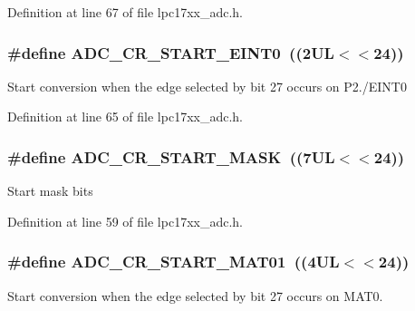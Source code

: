 \-Definition at line 67 of file lpc17xx\-\_\-adc.\-h.

\hypertarget{group___a_d_c___private___macros_gac821b0162480d224ff928bf834bcb431}{
\subsubsection[{\-A\-D\-C\-\_\-\-C\-R\-\_\-\-S\-T\-A\-R\-T\-\_\-\-E\-I\-N\-T0}]{\setlength{\rightskip}{0pt plus 5cm}\#define {\bf \-A\-D\-C\-\_\-\-C\-R\-\_\-\-S\-T\-A\-R\-T\-\_\-\-E\-I\-N\-T0}~((2\-U\-L$<$$<$24))}}\label{group___a_d_c___private___macros_gac821b0162480d224ff928bf834bcb431}
\-Start conversion when the edge selected by bit 27 occurs on \-P2./\-E\-I\-N\-T0 

\-Definition at line 65 of file lpc17xx\-\_\-adc.\-h.

\hypertarget{group___a_d_c___private___macros_gadb696eab756362a8e2dbc5502f8bdeaf}{
\subsubsection[{\-A\-D\-C\-\_\-\-C\-R\-\_\-\-S\-T\-A\-R\-T\-\_\-\-M\-A\-S\-K}]{\setlength{\rightskip}{0pt plus 5cm}\#define {\bf \-A\-D\-C\-\_\-\-C\-R\-\_\-\-S\-T\-A\-R\-T\-\_\-\-M\-A\-S\-K}~((7\-U\-L$<$$<$24))}}\label{group___a_d_c___private___macros_gadb696eab756362a8e2dbc5502f8bdeaf}
\-Start mask bits 

\-Definition at line 59 of file lpc17xx\-\_\-adc.\-h.

\hypertarget{group___a_d_c___private___macros_ga4accee65c727e3ba2e188617109ad01e}{
\subsubsection[{\-A\-D\-C\-\_\-\-C\-R\-\_\-\-S\-T\-A\-R\-T\-\_\-\-M\-A\-T01}]{\setlength{\rightskip}{0pt plus 5cm}\#define {\bf \-A\-D\-C\-\_\-\-C\-R\-\_\-\-S\-T\-A\-R\-T\-\_\-\-M\-A\-T01}~((4\-U\-L$<$$<$24))}}\label{group___a_d_c___private___macros_ga4accee65c727e3ba2e188617109ad01e}
\-Start conversion when the edge selected by bit 27 occurs on \-M\-A\-T0. 


